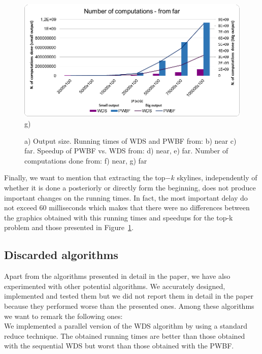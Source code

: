 \documentclass[11pt,onecolumn]{elsart3p}
\begin{document}
\begin{figure}[]
\begin{center}
        \includegraphics[width=0.45\linewidth]{img/comp_f_sb.eps} g)
        \caption{a) Output size. Running times of WDS and PWBF from: b) near c) far. Speedup of PWBF vs. WDS from: d) near, e) far. Number of computations done from: f) near, g) far}\label{fig:rtimes}
      \end{center}
    \end{figure}

Finally, we want to mention that extracting the top$-k$ skylines, independently of whether it is done a posteriorly or directly form the beginning, does not produce important changes on the running times. In fact, the most important delay do not exceed 60 milliseconds which makes that there were no differences between the graphics obtained with this running times and speedups for the top-k problem and those presented in Figure~\ref{fig:rtimes}.


\subsection{Discarded algorithms}\label{sec:ExpResultsDis}

Apart from the algorithms presented in detail in the paper, we have also experimented with other potential algorithms. We accurately designed, implemented and tested them but we did not report them in detail in the paper because they performed worse than the presented ones. Among these algorithms we want to remark the following ones:\\


 We implemented a parallel version of the WDS algorithm by using a standard reduce technique. The obtained running times are better than those obtained with the sequential WDS but worst than those obtained with the PWBF. \\%
\end{document}
